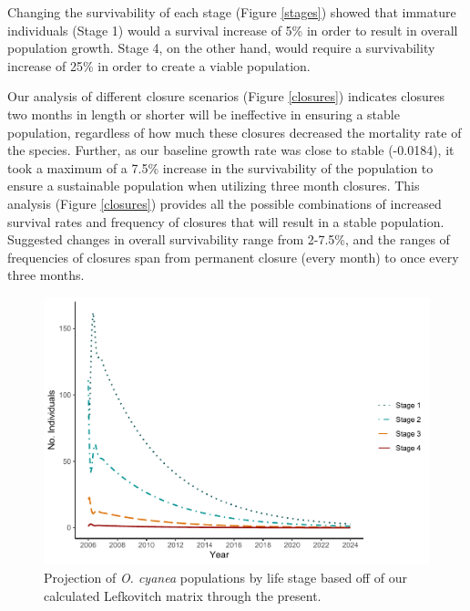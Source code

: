 \documentclass[
  12pt,
]{article}
\begin{document}
Changing the survivability of each stage (Figure \ref{stages}) showed that immature individuals (Stage 1) would a survival increase of 5\% in order to result in overall population growth. Stage 4, on the other hand, would require a survivability increase of 25\% in order to create a viable population.

Our analysis of different closure scenarios (Figure \ref{closures}) indicates closures two months in length or shorter will be ineffective in ensuring a stable population, regardless of how much these closures decreased the mortality rate of the species. Further, as our baseline growth rate was close to stable (-0.0184), it took a maximum of a 7.5\% increase in the survivability of the population to ensure a sustainable population when utilizing three month closures. This analysis (Figure \ref{closures}) provides all the possible combinations of increased survival rates and frequency of closures that will result in a stable population. Suggested changes in overall survivability range from 2-7.5\%, and the ranges of frequencies of closures span from permanent closure (every month) to once every three months.



\begin{figure}
\centering
\includegraphics{Wulfing_Thesis_files/figure-latex/projection-1.pdf}
\caption{\label{fig:projection}Projection of \emph{O. cyanea} populations by life stage based off of our calculated Lefkovitch matrix through the present. \label{projection}}
\end{figure}
\end{document}
